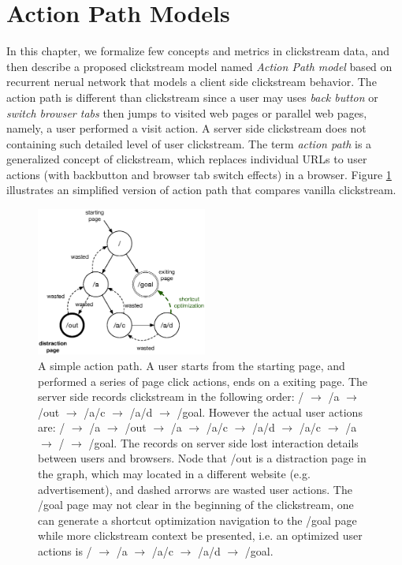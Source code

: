 \section{Action Path Models}
\label{ch:model}

In this chapter, we formalize few concepts and metrics in clickstream data,
and then describe a proposed clickstream model named \emph{Action Path model} 
based on recurrent nerual network that models a client side clickstream behavior. 
The action path is different than clickstream since 
a user may uses \emph{back button} or \emph{switch browser tabs} then jumps to visited web pages 
or parallel web pages, namely, a user performed a visit action.
A server side clickstream does not containing such detailed level of user clickstream. 
The term \emph{action path} is a generalized concept of clickstream, which replaces individual URLs 
to user actions (with backbutton and browser tab switch effects) in a browser. Figure \ref{fig:clickstream}
illustrates an simplified version of action path that compares vanilla clickstream.

\begin{figure}[H]
    \centering
    \includegraphics[width=0.5\textwidth]{figures/clickstream}
    \caption{A simple action path. A user starts from the starting page, and performed
    a series of page click actions, ends on a exiting page. 
    The server side records clickstream in the following order:
    / $\rightarrow$ /a $\rightarrow$ /out $\rightarrow$ /a/c $\rightarrow$ /a/d $\rightarrow$ /goal.
    However the actual user actions are: 
    / $\rightarrow$ /a $\rightarrow$ /out $\rightarrow$ /a $\rightarrow$ /a/c $\rightarrow$ /a/d 
    $\rightarrow$ /a/c $\rightarrow$ /a $\rightarrow$ / $\rightarrow$ /goal. 
    The records on server side lost interaction details between users and browsers.
    Node that /out is a distraction page in the graph, 
    which may located in a different website (e.g. advertisement), 
    and dashed arrorws are wasted user
    actions. The /goal page may not clear in the beginning of the clickstream, one can generate
    a shortcut optimization navigation to the /goal page while more clickstream context
    be presented, i.e. an optimized user actions is 
    / $\rightarrow$ /a $\rightarrow$ /a/c $\rightarrow$ /a/d $\rightarrow$ /goal.}
    \label{fig:clickstream}
\end{figure}

